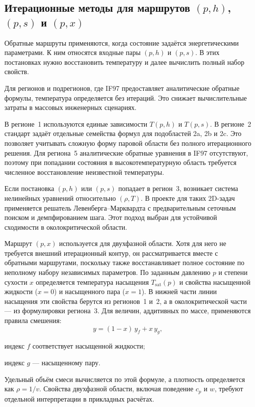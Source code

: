 \subsection{Итерационные методы для маршрутов \texorpdfstring{$(p, h)$, $(p, s)$ и $(p, x)$}{(p, h), (p, s) и (p, x)}}

Обратные маршруты применяются,
когда состояние задаётся энергетическими параметрами.
К ним относятся входные пары $(p, h)$ и $(p, s)$.
В этих постановках нужно восстановить температуру
и далее вычислить полный набор свойств.

Для регионов и подрегионов,
где IF97 предоставляет аналитические обратные формулы,
температура определяется без итераций.
Это снижает вычислительные затраты
в массовых инженерных сценариях.

В регионе~1 используются единые зависимости
$T(p, h)$ и $T(p, s)$.
В регионе~2 стандарт задаёт отдельные семейства формул
для подобластей 2a, 2b и 2c.
Это позволяет учитывать сложную форму паровой области
без полного итерационного решения.
Для региона~5 аналитические обратные уравнения
в IF97 отсутствуют,
поэтому при попадании состояния в высокотемпературную область
требуется численное восстановление неизвестной температуры.

Если постановка $(p, h)$ или $(p, s)$ попадает в регион~3,
возникает система нелинейных уравнений относительно $(\rho, T)$.
В проекте для таких 2D-задач применяется решатель
Левенберга--Марквардта с предварительным сеточным поиском
и демпфированием шага.
Этот подход выбран для устойчивой сходимости
в околокритической области.

Маршрут $(p, x)$ используется для двухфазной области.
Хотя для него не требуется внешний итерационный контур,
он рассматривается вместе с обратными маршрутами,
поскольку также восстанавливает полное состояние
по неполному набору независимых параметров.
По заданным давлению $p$ и степени сухости $x$ определяется температура насыщения $T_{\mathrm{sat}}(p)$ и свойства насыщенной жидкости
($x=0$) и насыщенного пара ($x=1$).
В нижней части линии насыщения
эти свойства берутся из регионов~1 и~2,
а в околокритической части ---
из формулировки региона~3.
Для величин, аддитивных по массе, применяются правила смешения:
\begin{equation}
y = (1-x)\,y_{f} + x\,y_{g},
\end{equation}
\begin{gostwhere}
\item индекс $f$ соответствует насыщенной жидкости;
\item индекс $g$ --- насыщенному пару.
\end{gostwhere}

Удельный объём смеси вычисляется по этой формуле, а плотность определяется как $\rho = 1/v$.
Свойства двухфазной области, включая поведение $c_p$ и $w$,
требуют отдельной интерпретации в прикладных расчётах.

